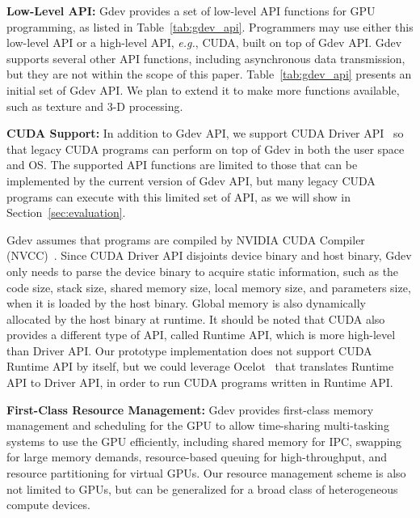 \textbf{Low-Level API:}
Gdev provides a set of low-level API functions for GPU programming, as
listed in Table~\ref{tab:gdev_api}.
Programmers may use either this low-level API or a high-level API,
\textit{e.g.}, CUDA, built on top of Gdev API.
Gdev supports several other API functions, including asynchronous data
transmission, but they are not within the scope of this paper.
Table~\ref{tab:gdev_api} presents an initial set of Gdev API.
We plan to extend it to make more functions available, such as texture
and 3-D processing.

\textbf{CUDA Support:}
In addition to Gdev API, we support CUDA Driver API~\cite{CUDA40} so
that legacy CUDA programs can perform on top of Gdev in both the user
space and OS.
The supported API functions are limited to those that can be implemented 
by the current version of Gdev API, but many legacy CUDA programs can
execute with this limited set of API, as we will show in
Section~\ref{sec:evaluation}.

Gdev assumes that programs are compiled by NVIDIA CUDA Compiler
(NVCC)~\cite{CUDA40}.
Since CUDA Driver API disjoints device binary and host binary, Gdev only
needs to parse the device binary to acquire static information, such
as the code size, stack size, shared memory size, local memory size, and
parameters size, when it is loaded by the host binary.
Global memory is also dynamically allocated by the host binary at
runtime.
It should be noted that CUDA also provides a different type of API,
called Runtime API, which is more high-level than Driver API.
Our prototype implementation does not support CUDA Runtime API by
itself, but we could leverage Ocelot~\cite{Diamos_PACT10} that
translates Runtime API to Driver API, in order to run CUDA programs
written in Runtime API.

\textbf{First-Class Resource Management:}
Gdev provides first-class memory management and scheduling for the GPU
to allow time-sharing multi-tasking systems to use the GPU efficiently,
including shared memory for IPC, swapping for large memory demands,
resource-based queuing for high-throughput, and resource partitioning
for virtual GPUs.
Our resource management scheme is also not limited to GPUs, but can be
generalized for a broad class of heterogeneous compute devices.

